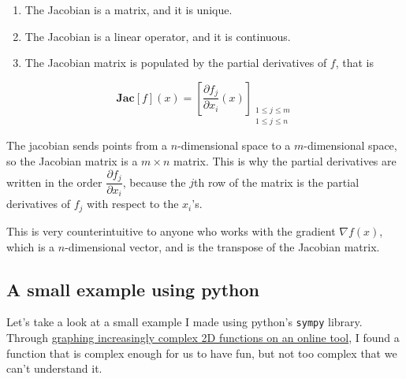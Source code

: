 \documentclass[
  letterpaper,
  DIV=11,
  numbers=noendperiod]{scrreprt}
\providecommand{\tightlist}{%
  \setlength{\itemsep}{0pt}\setlength{\parskip}{0pt}}\usepackage{longtable,booktabs,array}
\begin{document}
\begin{enumerate}
\def\labelenumi{\arabic{enumi}.}
\tightlist
\item
  The Jacobian is a matrix, and it is unique.
\item
  The Jacobian is a linear operator, and it is continuous.
\item
  The Jacobian matrix is populated by the partial derivatives of \(f\),
  that is
\end{enumerate}

\[ \textbf{Jac}[f](x) = \left[\dfrac{\partial f_j}{\partial x_i}(x)\right]_{\substack{1\leq j \leq m\\1\leq j \leq n}}\]

\begin{tcolorbox}[enhanced jigsaw, toptitle=1mm, colbacktitle=quarto-callout-caution-color!10!white, toprule=.15mm, opacitybacktitle=0.6, opacityback=0, left=2mm, titlerule=0mm, breakable, coltitle=black, arc=.35mm, bottomrule=.15mm, bottomtitle=1mm, leftrule=.75mm, rightrule=.15mm, colframe=quarto-callout-caution-color-frame, title=\textcolor{quarto-callout-caution-color}{\faFire}\hspace{0.5em}{Careful about the dimensions !}, colback=white]

The jacobian sends points from a \(n\)-dimensional space to a
\(m\)-dimensional space, so the Jacobian matrix is a \(m\times n\)
matrix. This is why the partial derivatives are written in the order
\(\dfrac{\partial f_j}{\partial x_i}\), because the \(j\)th row of the
matrix is the partial derivatives of \(f_j\) with respect to the
\(x_i\)'s.

This is very counterintuitive to anyone who works with the gradient
\(\nabla f(x)\), which is a \(n\)-dimensional vector, and is the
transpose of the Jacobian matrix.

\end{tcolorbox}

\hypertarget{a-small-example-using-python}{%
\subsection{A small example using
python}\label{a-small-example-using-python}}

Let's take a look at a small example I made using python's
\texttt{sympy} library. Through \href{https://www.math3d.org/}{graphing
increasingly complex 2D functions on an online tool}, I found a function
that is complex enough for us to have fun, but not too complex that we
can't understand it.
\end{document}
